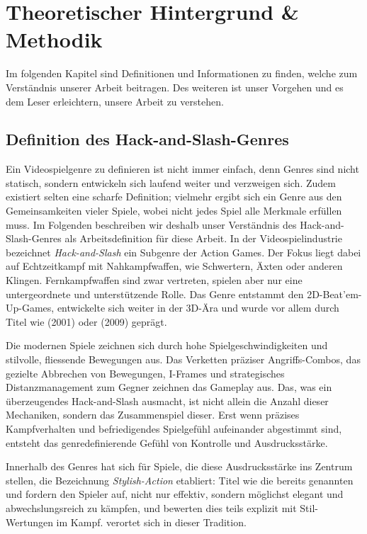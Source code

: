 \documentclass[../Main.tex]{subfiles}
\begin{document}
\section{Theoretischer Hintergrund \& Methodik}
Im folgenden Kapitel sind Definitionen und Informationen zu finden, welche zum Verständnis unserer Arbeit beitragen. Des weiteren ist unser Vorgehen  und es dem Leser erleichtern, unsere Arbeit zu verstehen.

\subsection{Definition des Hack-and-Slash-Genres} \label{sec:Genredefinition}
Ein Videospielgenre zu definieren ist nicht immer einfach, denn Genres sind nicht statisch, sondern entwickeln sich laufend weiter und verzweigen sich. Zudem existiert selten eine scharfe Definition; vielmehr ergibt sich ein Genre aus den Gemeinsamkeiten vieler Spiele, wobei nicht jedes Spiel alle Merkmale erfüllen muss. Im Folgenden beschreiben wir deshalb unser Verständnis des Hack-and-Slash-Genres als Arbeitsdefinition für diese Arbeit. In der Videospielindustrie bezeichnet \textit{Hack-and-Slash} ein Subgenre der Action Games.\autocite{wikipedia_hackandslash} Der Fokus liegt dabei auf Echtzeitkampf mit Nahkampfwaffen, wie Schwertern, Äxten oder anderen Klingen. Fernkampfwaffen sind zwar vertreten, spielen aber nur eine untergeordnete und unterstützende Rolle. Das Genre entstammt den 2D-Beat'em-Up-Games, entwickelte sich weiter in der 3D-Ära und wurde vor allem durch Titel wie  (2001)\autocite{wikipedia_devilmaycry} oder  (2009)\autocite{wikipedia_bayonetta} geprägt.

Die modernen Spiele zeichnen sich durch hohe Spielgeschwindigkeiten und stilvolle, fliessende Bewegungen aus. Das Verketten präziser Angriffs-Combos, das gezielte Abbrechen von Bewegungen, I-Frames und strategisches Distanzmanagement zum Gegner zeichnen das Gameplay aus. Das, was ein überzeugendes Hack-and-Slash ausmacht, ist nicht allein die Anzahl dieser Mechaniken, sondern das Zusammenspiel dieser. Erst wenn präzises Kampfverhalten und befriedigendes Spielgefühl aufeinander abgestimmt sind, entsteht das genredefinierende Gefühl von Kontrolle und Ausdrucksstärke.\autocite[s.5-s.7]{lindgren2025striking}

Innerhalb des Genres hat sich für Spiele, die diese Ausdrucksstärke ins Zentrum stellen, die Bezeichnung \textit{Stylish-Action} etabliert: Titel wie die bereits genannten  und  fordern den Spieler auf, nicht nur effektiv, sondern möglichst elegant und abwechslungsreich zu kämpfen, und bewerten dies teils explizit mit Stil-Wertungen im Kampf.  verortet sich in dieser Tradition.
\end{document}
